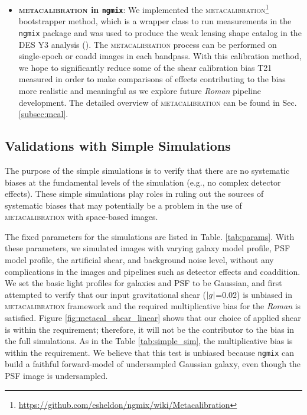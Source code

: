 \documentclass[fleqn,usenatbib]{mnras}
\begin{document}
\begin{itemize}
    \item \textbf{\textsc{metacalibration} in \texttt{ngmix}}: We implemented the \textsc{metacalibration}\footnote{\url{https://github.com/esheldon/ngmix/wiki/Metacalibration}} bootstrapper method, which is a wrapper class to run measurements in the \texttt{ngmix} package and was used to produce the weak lensing shape catalog in the DES Y3 analysis (\citealt{2020arXiv201103408G}). The \textsc{metacalibration} process can be performed on single-epoch or coadd images in each bandpass. With this calibration method, we hope to significantly reduce some of the shear calibration bias T21 measured in order to make comparisons of effects contributing to the bias more realistic and meaningful as we explore future \emph{Roman} pipeline development. The detailed overview of \textsc{metacalibration} can be found in Sec.\ref{subsec:mcal}. 
\end{itemize}


\subsection{Validations with Simple Simulations}
\label{subsec:simplesim}
The purpose of the simple simulations is to verify that there are no systematic biases at the fundamental levels of the simulation (e.g., no complex detector effects). These simple simulations play roles in ruling out the sources of systematic biases that may potentially be a problem in the use of \textsc{metacalibration} with space-based images. 

The fixed parameters for the simulations are listed in Table. \ref{tab:params}. With these parameters, we simulated images with varying galaxy model profile, PSF model profile, the artificial shear, and background noise level, without any complications in the images and pipelines such as detector effects and coaddition. We set the basic light profiles for galaxies and PSF to be Gaussian, and first attempted to verify that our input gravitational shear ($\abs{g}$=0.02) is unbiased in \textsc{metacalibration} framework and the required multiplicative bias for the \emph{Roman} is satisfied. Figure \ref{fig:metacal_shear_linear} shows that our choice of applied shear is within the requirement; therefore, it will not be the contributor to the bias in the full simulations. As in the Table \ref{tab:simple_sim}, the multiplicative bias is within the requirement. We believe that this test is unbiased because \texttt{ngmix} can build a faithful forward-model of undersampled Gaussian galaxy, even though the PSF image is undersampled.
\end{document}

